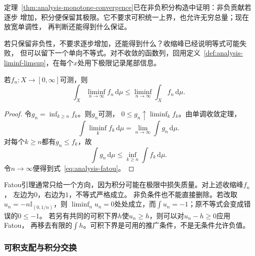 定理~\ref{thm:analysis-monotone-convergence}已在非负积分构造中证明：非负贡献若逐步
增加，积分便保留其极限。它不要求可积统一上界，也允许无穷总量；现在放宽单调性，
再判断还能得到什么保证。

若只保留非负性，不要求逐步增加，还能得到什么？收缩峰已经说明等式可能失败，
但可以留下一个单向不等式。对不收敛的函数列，回用定义~\ref{def:analysis-liminf-limsup}，在每个$x$处用下极限记录尾部信息。
\begin{lemma}[Fatou引理]
\label{lem:analysis-fatou}
若$f_n:X\to[0,\infty]$可测，则
\begin{equation}
  \int_X\liminf_{n\to\infty}f_n\,\mathrm{d}\mu
  \leq
  \liminf_{n\to\infty}\int_Xf_n\,\mathrm{d}\mu.
\label{eq:analysis-fatou}
\end{equation}
\end{lemma}
\begin{proof}
令$g_n=\inf_{k\geq n}f_k$。则$g_n$可测， $0\leq g_n\uparrow\liminf_k f_k$。由单调收敛定理，
\[   \int\liminf_k f_k\,\mathrm{d}\mu   =   \lim_{n\to\infty}\int g_n\,\mathrm{d}\mu. \]
对每个$k\geq n$都有$g_n\leq f_k$，故
\[   \int g_n\,\mathrm{d}\mu   \leq   \inf_{k\geq n}\int f_k\,\mathrm{d}\mu. \]
令$n\to\infty$便得到式~\eqref{eq:analysis-fatou}。
\end{proof}

Fatou引理通常只给一个方向，因为积分可能在极限中损失质量。对上述收缩峰$f_n$， 左边为$0$，右边为$1$，不等式严格成立。
非负条件也不能直接删除。若改取$u_n=-n\mathbb I_{(0,1/n)}$，则
$\liminf_n u_n=0$处处成立，而$\int u_n=-1$；原不等式会变成错误的$0\leq-1$。
若另有共同的可积下界$h$使$u_n\geq h$，则可以对$u_n-h\geq0$应用Fatou，
再移去有限的$\int h$。可积下界是可用的推广条件，不是无条件允许负值。

\subsubsection{可积支配与积分交换}


